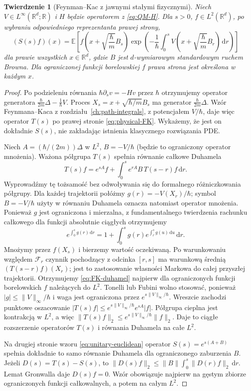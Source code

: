 \documentclass[11pt,a4paper,oneside]{report}
\numberwithin{equation}{chapter}
\theoremstyle{plain}
\newtheorem{twierdzenie}{Twierdzenie}[chapter]
\theoremstyle{definition}
\theoremstyle{remark}
\newcommand{\R}{\mathbb{R}}
\newcommand{\E}{\mathbb{E}}
\newcommand{\calF}{\mathcal{F}}
\newcommand{\dd}{\mathrm{d}}
\begin{document}
\begin{twierdzenie}[Feynman--Kac z jawnymi stałymi fizycznymi]
\label{th:physical-FK}
Niech $V\in L^\infty(\R^d;\R)$ i $H$ będzie operatorem
z \eqref{eq:QM-H}. Dla $s>0$, $f\in L^2(\R^d)$,
po wybraniu odpowiedniego reprezentanta prawej strony,
\[
 (S(s)f)(x)=\E\left[
 f\left(x+\sqrt{\frac{\hbar}{m}}B_s\right)
 \exp\left(-\frac1\hbar\int_0^s
 V\left(x+\sqrt{\frac{\hbar}{m}}B_r\right)\,\dd r\right)
 \right]
\tag{16.3}\label{eq:physical-FK}
\]
dla prawie wszystkich $x\in\R^d$, gdzie $B$ jest
$d$-wymiarowym standardowym ruchem Browna.
Dla ograniczonej funkcji borelowskiej $f$ prawa strona
jest określona w każdym $x$.
\end{twierdzenie}
\begin{proof}
Po podzieleniu równania $\hbar\partial_s v=-Hv$ przez
$\hbar$ otrzymujemy operator generatora
$\frac{\hbar}{2m}\Delta-\frac1\hbar V$.
Proces $X_s=x+\sqrt{\hbar/m}B_s$ ma generator
$\frac{\hbar}{2m}\Delta$.
Wzór Feynmana--Kaca z rozdziału~\ref{ch:path-integrals},
z potencjałem $V/\hbar$, daje więc operator $T(s)$ po
prawej stronie \eqref{eq:physical-FK}. Wykażemy, że jest
on dokładnie $S(s)$, nie zakładając istnienia klasycznego
rozwiązania PDE.

Niech $A=(\hbar/(2m))\Delta$ w $L^2$, $B=-V/\hbar$
(będzie to ograniczony operator mnożenia). Ważona
półgrupa $T(s)$ spełnia równanie całkowe Duhamela
\[
 T(s)f=e^{sA}f+\int_0^s e^{rA}B\,T(s-r)f\,\dd r.
\tag{16.4}\label{eq:FK-duhamel}
\]
Wyprowadźmy tę tożsamość bez odwoływania się do
formalnego różniczkowania półgrupy. Dla każdej trajektorii
połóżmy $g(r)=-V(X_r)/\hbar$; symbol $B=-V/\hbar$
użyty w równaniu Duhamela oznacza natomiast operator mnożenia.
Ponieważ $g$ jest ograniczona i mierzalna, z fundamentalnego
twierdzenia rachunku całkowego dla funkcji absolutnie
ciągłych otrzymujemy
\[
 e^{\int_0^s g(r)\,\dd r}
 =1+\int_0^s g(r)e^{\int_r^s g(u)\,\dd u}\,\dd r.
\]
Mnożymy przez $f(X_s)$ i bierzemy wartość oczekiwaną.
Po warunkowaniu względem $\calF_r$ czynnik pochodzący
z odcinka $[r,s]$ ma warunkową średnią
$(T(s-r)f)(X_r)$; jest to zastosowanie własności Markowa
do całej przyszłej trajektorii. Otrzymujemy
\eqref{eq:FK-duhamel} najpierw dla ograniczonych
funkcji borelowskich $f$ należących do $L^2$.
Tonelli lub Fubini wolno stosować, ponieważ
$|g|\le\|V\|_\infty/\hbar$ i waga jest ograniczona przez
$e^{s\|V\|_\infty/\hbar}$.
Wreszcie zachodzi punktowe oszacowanie
$|T(s)f|\le e^{s\|V\|_\infty/\hbar}e^{sA}|f|$.
Półgrupa cieplna jest kontrakcją w $L^2$, a więc
$\|T(s)f\|_2\le e^{s\|V\|_\infty/\hbar}\|f\|_2$.
Daje to ciągłe rozszerzenie operatorów $T(s)$ i
równania Duhamela na całe $L^2$.

Na drugiej stronie wzoru \eqref{eq:unitary-euclidean}
operator $S(s)=e^{s(A+B)}$ spełnia dokładnie to samo
równanie Duhamela dla ograniczonego zaburzenia $B$.
Jeżeli $D(s)=T(s)-S(s)$, to
$\|D(s)f\|_2\le\|B\|\int_0^s\|D(r)f\|_2\,\dd r$.
Lemat Gronwalla daje $D(s)f=0$. Wzór obowiązuje
najpierw na gęstym zbiorze ograniczonych funkcji
całkowalnych, a potem na całym $L^2$.
\end{proof}
\end{document}
